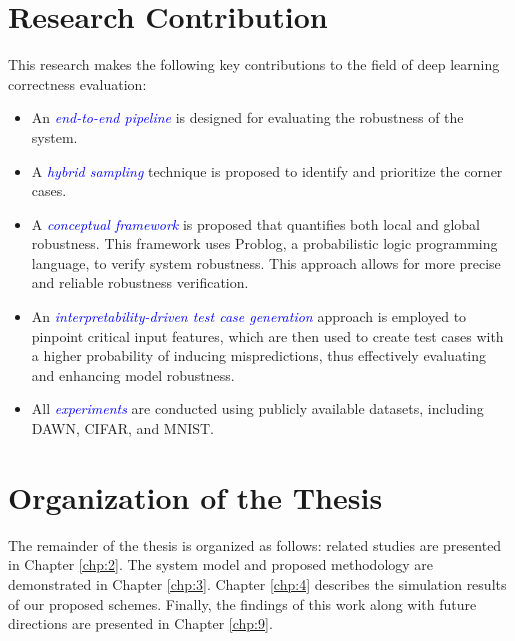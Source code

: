 \section{Research Contribution}

This research makes the following key contributions to the field of deep learning correctness evaluation:

\begin{itemize}
    \item An \textit{\textcolor{blue}{end-to-end pipeline}} is designed for evaluating the robustness of the system.
    \item A \textit{\textcolor{blue}{hybrid sampling}} technique is proposed to identify and prioritize the corner cases.
    \item A \textit{\textcolor{blue}{conceptual framework}} is proposed that quantifies both local and global robustness. This framework uses Problog, a probabilistic logic programming language, to verify system robustness. This approach allows for more precise and reliable robustness verification.
    \item An \textit{\textcolor{blue}{interpretability-driven test case generation}} approach is employed to pinpoint critical input features, which are then used to create test cases with a higher probability of inducing mispredictions, thus effectively evaluating and enhancing model robustness.
    \item All \textit{\textcolor{blue}{experiments}} are conducted using publicly available datasets, including DAWN, CIFAR, and MNIST.
\end{itemize}

\begin{center}
    \end{center}
\section{Organization of the Thesis}\hypertarget{organization of thesis}{}
The remainder of the thesis is organized as follows: related studies are presented in Chapter \ref{chp:2}. The system model and proposed methodology are demonstrated in Chapter \ref{chp:3}. Chapter \ref{chp:4} describes the simulation results of our proposed schemes. Finally, the findings of this work along with future directions are presented in Chapter \ref{chp:9}.




\clearpage
